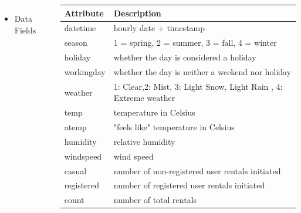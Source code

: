 \documentclass{tikzposter} %
\begin{document}
\begin{columns}
{\begin{itemize}
    \item
    Data Fields
    \end{itemize} 
      
    \bigskip 
      \begin{tabular}{ l | l }
        \toprule
        Attribute     &  Description          \\
        \midrule
        datetime       &  hourly date + timestamp  \\
        season      & 1 = spring, 2 = summer, 3 = fall, 4 = winter\\ 
        holiday  & whether the day is considered a holiday\\
        workingday & whether the day is neither a weekend nor holiday\\
        weather    & 1: Clear,2: Mist, 3: Light Snow, Light Rain , 4: Extreme weather\\ 
        temp  & temperature in Celsius\\
        atemp  & "feels like" temperature in Celsius\\
        humidity  & relative humidity\\
        windspeed  &  wind speed\\
        casual  & number of non-registered user rentals initiated\\
        registered  & number of registered user rentals initiated\\
        count  & number of total rentals \\
    
        \bottomrule
      \end{tabular}



}








\end{columns}
\end{document}
